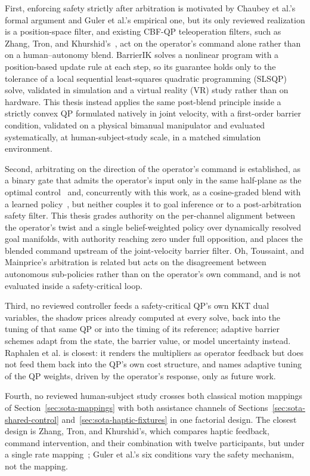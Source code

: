 First, enforcing safety strictly after arbitration is motivated by Chaubey et al.'s formal argument and Guler et al.'s empirical one, but its only reviewed realization is a position-space filter, and existing CBF-QP teleoperation filters, such as Zhang, Tron, and Khurshid's~\cite{zhang2021hapticagreement}, act on the operator's command alone rather than on a human--autonomy blend. BarrierIK solves a nonlinear program with a position-based update rule at each step, so its guarantee holds only to the tolerance of a local sequential least-squares quadratic programming (SLSQP) solve, validated in simulation and a virtual reality (VR) study rather than on hardware. This thesis instead applies the same post-blend principle inside a strictly convex QP formulated natively in joint velocity, with a first-order barrier condition, validated on a physical bimanual manipulator and evaluated systematically, at human-subject-study scale, in a matched simulation environment.

Second, arbitrating on the direction of the operator's command is established, as a binary gate that admits the operator's input only in the same half-plane as the optimal control~\cite{broad2017learning} and, concurrently with this work, as a cosine-graded blend with a learned policy~\cite{zhou2026saps}, but neither couples it to goal inference or to a post-arbitration safety filter. This thesis grades authority on the per-channel alignment between the operator's twist and a single belief-weighted policy over dynamically resolved goal manifolds, with authority reaching zero under full opposition, and places the blended command upstream of the joint-velocity barrier filter. Oh, Toussaint, and Mainprice's arbitration is related but acts on the disagreement between autonomous sub-policies rather than on the operator's own command, and is not evaluated inside a safety-critical loop.

Third, no reviewed controller feeds a safety-critical QP's own KKT dual variables, the shadow prices already computed at every solve, back into the tuning of that same QP or into the timing of its reference; adaptive barrier schemes adapt from the state, the barrier value, or model uncertainty instead. Raphalen et al. is closest: it renders the multipliers as operator feedback but does not feed them back into the QP's own cost structure, and names adaptive tuning of the QP weights, driven by the operator's response, only as future work.

Fourth, no reviewed human-subject study crosses both classical motion mappings of Section~\ref{sec:sota-mappings} with both assistance channels of Sections~\ref{sec:sota-shared-control} and~\ref{sec:sota-haptic-fixtures} in one factorial design. The closest design is Zhang, Tron, and Khurshid's, which compares haptic feedback, command intervention, and their combination with twelve participants, but under a single rate mapping~\cite{zhang2021hapticagreement}; Guler et al.'s six conditions vary the safety mechanism, not the mapping.

